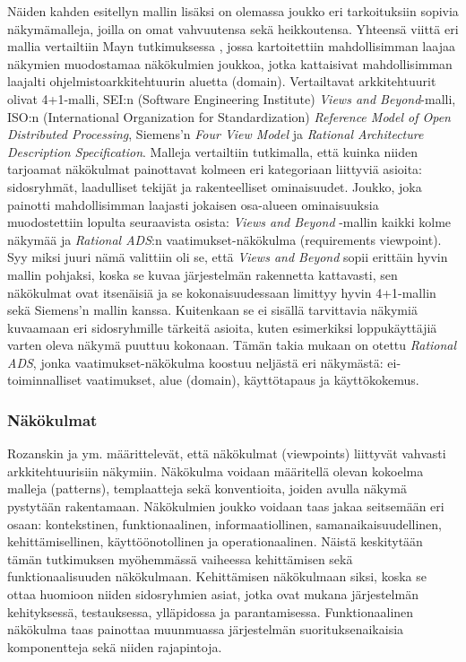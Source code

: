 \documentclass[finnish]{tktltiki2}
\theoremstyle{definition}
\theoremstyle{remark}
\begin{document}
Näiden kahden esitellyn mallin lisäksi on olemassa joukko eri tarkoituksiin sopivia näkymämalleja, joilla on omat vahvuutensa sekä heikkoutensa. Yhteensä viittä eri mallia vertailtiin Mayn tutkimuksessa \citep{may2005survey}, jossa kartoitettiin mahdollisimman laajaa näkymien muodostamaa näkökulmien joukkoa, jotka kattaisivat mahdollisimman laajalti ohjelmistoarkkitehtuurin aluetta (domain). Vertailtavat arkkitehtuurit olivat 4+1-malli, SEI:n (Software Engineering Institute) \textit{Views and Beyond}-malli, ISO:n (International Organization for Standardization) \textit{Reference Model of Open Distributed Processing}, Siemens'n \textit{Four View Model} ja \textit{Rational Architecture Description Specification}. Malleja vertailtiin tutkimalla, että kuinka niiden tarjoamat näkökulmat painottavat kolmeen eri kategoriaan liittyviä asioita: sidosryhmät, laadulliset tekijät ja rakenteelliset ominaisuudet. Joukko, joka painotti mahdollisimman laajasti jokaisen osa-alueen ominaisuuksia muodostettiin lopulta seuraavista osista: \textit{Views and Beyond} -mallin kaikki kolme näkymää ja \textit{Rational ADS}:n vaatimukset-näkökulma (requirements viewpoint). Syy miksi juuri nämä valittiin oli se, että \textit{Views and Beyond} sopii erittäin hyvin mallin pohjaksi, koska se kuvaa järjestelmän rakennetta kattavasti, sen näkökulmat ovat itsenäisiä ja se kokonaisuudessaan limittyy hyvin 4+1-mallin sekä Siemens'n mallin kanssa. Kuitenkaan se ei sisällä tarvittavia näkymiä kuvaamaan eri sidosryhmille tärkeitä asioita, kuten esimerkiksi loppukäyttäjiä varten oleva näkymä puuttuu kokonaan. Tämän takia mukaan on otettu \textit{Rational ADS}, jonka vaatimukset-näkökulma koostuu neljästä eri näkymästä: ei-toiminnalliset vaatimukset, alue (domain), käyttötapaus ja käyttökokemus. 



\subsubsection{Näkökulmat}
Rozanskin ja ym. \citep[s. 36-42]{Rozanski:2011:SSA:2072649} määrittelevät, että näkökulmat (viewpoints) liittyvät vahvasti arkkitehtuurisiin näkymiin. Näkökulma voidaan määritellä olevan kokoelma malleja (patterns), templaatteja sekä konventioita, joiden avulla näkymä pystytään rakentamaan.  Näkökulmien joukko voidaan taas jakaa seitsemään eri osaan: kontekstinen, funktionaalinen, informaatiollinen, samanaikaisuudellinen, kehittämisellinen, käyttöönotollinen ja operationaalinen. Näistä keskitytään tämän tutkimuksen myöhemmässä vaiheessa kehittämisen sekä funktionaalisuuden näkökulmaan. Kehittämisen näkökulmaan siksi, koska se ottaa huomioon niiden sidosryhmien asiat, jotka ovat mukana järjestelmän kehityksessä, testauksessa, ylläpidossa ja parantamisessa. Funktionaalinen näkökulma taas painottaa muunmuassa järjestelmän suorituksenaikaisia komponentteja sekä niiden rajapintoja.
\end{document}
